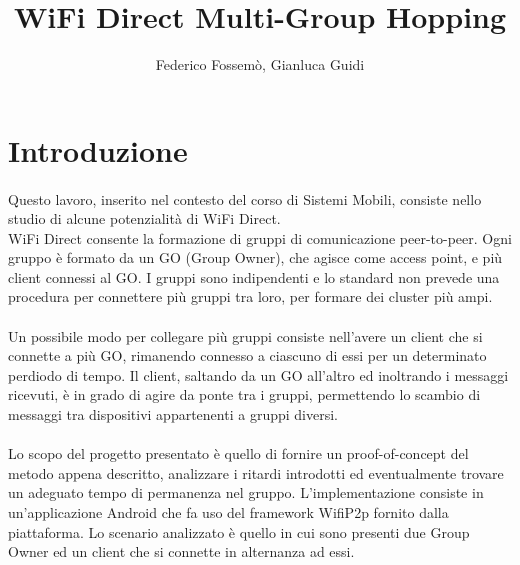 \documentclass{llncs}
\begin{document}
	\mainmatter              %
	\title{WiFi Direct Multi-Group Hopping}
	\author{Federico Fossemò, Gianluca Guidi}
	\maketitle
	
	\begin{abstract}
	\end{abstract}

\section{Introduzione}

\paragraph{} Questo lavoro, inserito nel contesto del corso di Sistemi Mobili, consiste nello studio di alcune potenzialità di WiFi Direct.\\
WiFi Direct consente la formazione di gruppi di comunicazione peer-to-peer. Ogni gruppo è formato da un GO (Group Owner), che agisce come access point, e più client connessi al GO. I gruppi sono indipendenti e lo standard non prevede una procedura per connettere più gruppi tra loro, per formare dei cluster più ampi.

\paragraph{} Un possibile modo per collegare più gruppi consiste nell'avere un client che si connette a più GO, rimanendo connesso a ciascuno di essi per un determinato perdiodo di tempo. Il client, saltando da un GO all'altro ed inoltrando i messaggi ricevuti, è in grado di agire da ponte tra i gruppi, permettendo lo scambio di messaggi tra dispositivi appartenenti a gruppi diversi.

\paragraph{} Lo scopo del progetto presentato è quello di fornire un proof-of-concept del metodo appena descritto, analizzare i ritardi introdotti ed eventualmente trovare un adeguato tempo di permanenza nel gruppo. L'implementazione consiste in un'applicazione Android che fa uso del framework WifiP2p fornito dalla piattaforma. Lo scenario analizzato è quello in cui sono presenti due Group Owner ed un client che si connette in alternanza ad essi.
\end{document}
